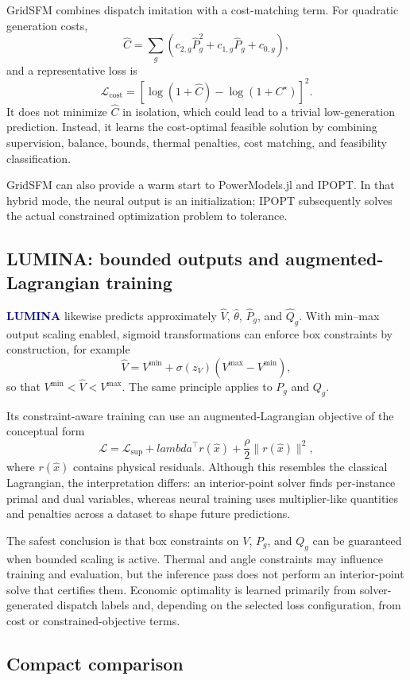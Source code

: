 \documentclass[11pt,a4paper]{article}
\newcommand{\model}[1]{\textcolor{navy}{\textbf{#1}}}
\begin{document}
GridSFM combines dispatch imitation with a cost-matching term. For quadratic generation costs,
\[
\widehat C=\sum_g\left(c_{2,g}\widehat P_g^2+c_{1,g}\widehat P_g+c_{0,g}\right),
\]
and a representative loss is
\[
\mathcal L_{\mathrm{cost}}=
\left[\log(1+\widehat C)-\log(1+C^\star)\right]^2.
\]
It does not minimize $\widehat C$ in isolation, which could lead to a trivial low-generation prediction. Instead, it learns the cost-optimal feasible solution by combining supervision, balance, bounds, thermal penalties, cost matching, and feasibility classification.

GridSFM can also provide a warm start to PowerModels.jl and IPOPT. In that hybrid mode, the neural output is an initialization; IPOPT subsequently solves the actual constrained optimization problem to tolerance.

\subsection{LUMINA: bounded outputs and augmented-Lagrangian training}

\model{LUMINA} likewise predicts approximately $\widehat V$, $\widehat\theta$, $\widehat P_g$, and $\widehat Q_g$. With min--max output scaling enabled, sigmoid transformations can enforce box constraints by construction, for example
\[
\widehat V=V^{\min}+\sigma(z_V)(V^{\max}-V^{\min}),
\]
so that $V^{\min}<\widehat V<V^{\max}$. The same principle applies to $P_g$ and $Q_g$.

Its constraint-aware training can use an augmented-Lagrangian objective of the conceptual form
\[
\mathcal L=\mathcal L_{\mathrm{sup}}+lambda^\top r(\widehat x)
+\frac{\rho}{2}\|r(\widehat x)\|^2,
\]
where $r(\widehat x)$ contains physical residuals. Although this resembles the classical Lagrangian, the interpretation differs: an interior-point solver finds per-instance primal and dual variables, whereas neural training uses multiplier-like quantities and penalties across a dataset to shape future predictions.

The safest conclusion is that box constraints on $V$, $P_g$, and $Q_g$ can be guaranteed when bounded scaling is active. Thermal and angle constraints may influence training and evaluation, but the inference pass does not perform an interior-point solve that certifies them. Economic optimality is learned primarily from solver-generated dispatch labels and, depending on the selected loss configuration, from cost or constrained-objective terms.

\subsection{Compact comparison}
\end{document}
